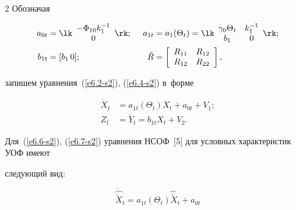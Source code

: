 \begin{multicols}{2}
Обозначая

   \begin{alignat*}{2}

    a_{0t} &= \lk \begin{array}{c}

    -\Phi_{10} k_1^{-1}\\

    0

    \end{array}\rk; &\enskip

    a_{1t} &= a_1 (\Theta_t) = \lk \begin{array}{cc}

    \gamma_0 \Theta_t&k_1^{-1}\\

    b_1&0

    \end{array}\rk;

\\

b_{1t} &= [b_1\, 0]; &\enskip \tilde R &= \left[\begin{array}{cc}

    R_{11}& R_{12}\\

    R_{12}& R_{22}

    \end{array}\right],


    \end{alignat*}

запишем уравнения~(\ref{e6.2-s2}), (\ref{e6.4-s2}) в~форме

 \begin{align}

 \dot X_t &= a_{1t}(\Theta_t) X_t + a_{0t} + V_1;

 \label{e6.6-s2}

\\

Z_t &=\dot Y_t = b_{1t} X_t + V_2.

\label{e6.7-s2}

\end{align}

Для~(\ref{e6.6-s2}), (\ref{e6.7-s2}) уравнения НСОФ~[5] для условных характеристик УОФ имеют 

сле\-ду\-ющий вид:

    \begin{equation}

    \dot{\hat{\tilde X}}_t = a_{1t} (\Theta_t){\hat{\tilde X}}_t + a_{0t} 


\end{equation}
\end{multicols}
